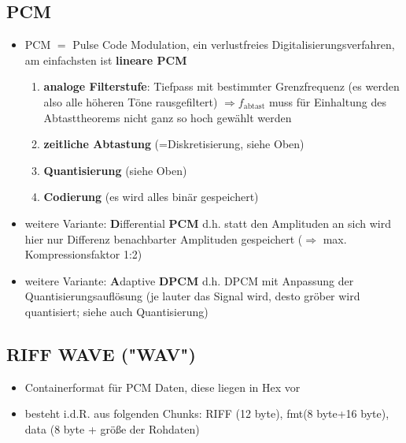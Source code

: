\documentclass[12pt,landscape]{article}
\begin{document}
\begin{multicols}{3}
\subsection{PCM}
\begin{itemize}
\item PCM $=$ Pulse Code Modulation, ein verlustfreies Digitalisierungsverfahren, am einfachsten ist \textbf{lineare PCM}
\begin{enumerate}
\item \textbf{analoge Filterstufe}: Tiefpass mit bestimmter Grenzfrequenz (es werden also alle höheren Töne rausgefiltert) $\Rightarrow f_{\text{abtast}}$ muss für Einhaltung des Abtasttheorems nicht ganz so hoch gewählt werden
\item \textbf{zeitliche Abtastung} (=Diskretisierung, siehe Oben)
\item \textbf{Quantisierung} (siehe Oben)
\item \textbf{Codierung} (es wird alles binär gespeichert)
\end{enumerate}
\item weitere Variante: \textbf{D}ifferential \textbf{PCM} d.h. statt den Amplituden an sich wird hier nur Differenz benachbarter Amplituden gespeichert ($\Rightarrow$ max. Kompressionsfaktor 1:2)
\item weitere Variante: \textbf{A}daptive \textbf{DPCM} d.h. DPCM mit Anpassung der Quantisierungsauflösung (je lauter das Signal wird, desto gröber wird quantisiert; siehe auch Quantisierung)
\end{itemize}
\subsection{RIFF WAVE ("WAV")}
\begin{itemize}
\item Containerformat für PCM Daten, diese liegen in Hex vor
\item besteht i.d.R. aus folgenden Chunks: RIFF (12 byte), fmt(8 byte+16 byte), data (8 byte + größe der Rohdaten) 
\end{itemize}

\end{multicols}
\end{document}
